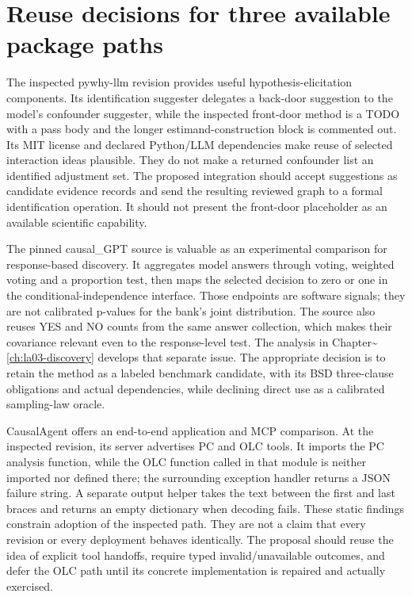 \hypertarget{reuse-decisions-for-three-available-package-paths}{%
\section{Reuse decisions for three available package
paths}\label{reuse-decisions-for-three-available-package-paths}}

The inspected pywhy-llm revision provides useful hypothesis-elicitation
components. Its identification suggester delegates a back-door
suggestion to the model's confounder suggester, while the inspected
front-door method is a TODO with a pass body and the longer
estimand-construction block is commented out. Its MIT license and
declared Python/LLM dependencies make reuse of selected interaction
ideas plausible. They do not make a returned confounder list an
identified adjustment set. The proposed integration should accept
suggestions as candidate evidence records and send the resulting
reviewed graph to a formal identification operation. It should not
present the front-door placeholder as an available scientific
capability. \citep{v12_la_package_pywhy_llm}

The pinned causal\_GPT source is valuable as an experimental comparison
for response-based discovery. It aggregates model answers through
voting, weighted voting and a proportion test, then maps the selected
decision to zero or one in the conditional-independence interface. Those
endpoints are software signals; they are not calibrated p-values for the
bank's joint distribution. The source also reuses YES and NO counts from
the same answer collection, which makes their covariance relevant even
to the response-level test. The analysis in
Chapter\textasciitilde{}\ref{ch:la03-discovery} develops that separate
issue. The appropriate decision is to retain the method as a labeled
benchmark candidate, with its BSD three-clause obligations and actual
dependencies, while declining direct use as a calibrated sampling-law
oracle. \citep{v12_la_package_causal_gpt}

CausalAgent offers an end-to-end application and MCP comparison. At the
inspected revision, its server advertises PC and OLC tools. It imports
the PC analysis function, while the OLC function called in that module
is neither imported nor defined there; the surrounding exception handler
returns a JSON failure string. A separate output helper takes the text
between the first and last braces and returns an empty dictionary when
decoding fails. These static findings constrain adoption of the
inspected path. They are not a claim that every revision or every
deployment behaves identically. The proposal should reuse the idea of
explicit tool handoffs, require typed invalid/unavailable outcomes, and
defer the OLC path until its concrete implementation is repaired and
actually exercised. \citep{v12_la_package_causalagent}

